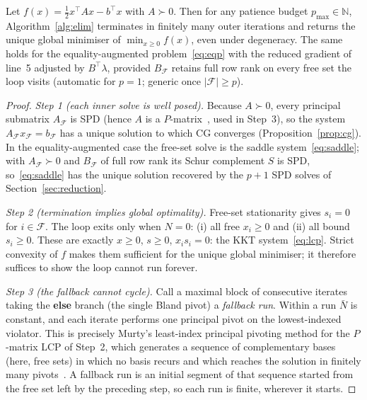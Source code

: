 \begin{theorem}\label{thm:termination}
Let $f(x) = \tfrac{1}{2}x^\top A x - b^\top x$ with $A \succ 0$. Then for any patience budget
$p_{\max} \in \mathbb{N}$, Algorithm~\ref{alg:elim} terminates in finitely many outer
iterations and returns the unique global minimiser of $\min_{x \geq 0} f(x)$, even under degeneracy. The same holds for the equality-augmented
problem~\eqref{eq:eqp} with the reduced gradient of line~5 adjusted by $B^\top\lambda$,
provided $B_{\mathcal{F}}$ retains full row rank on every free set the loop visits (automatic
for $p=1$; generic once $|\mathcal{F}| \geq p$).
\end{theorem}

\begin{proof}
\emph{Step 1 (each inner solve is well posed).}
Because $A \succ 0$, every principal submatrix $A_{\mathcal{F}}$ is SPD (hence $A$ is a
$P$-matrix~\cite{murty1988}, used in Step~3), so the system
$A_{\mathcal{F}}x_{\mathcal{F}} = b_{\mathcal{F}}$ has a unique solution to which CG converges
(Proposition~\ref{prop:cg}). In the
equality-augmented case the free-set solve is the saddle system~\eqref{eq:saddle}; with
$A_{\mathcal{F}} \succ 0$ and $B_{\mathcal{F}}$ of full row rank its Schur complement $S$ is
SPD, so~\eqref{eq:saddle} has the unique solution recovered by the $p+1$ SPD solves of
Section~\ref{sec:reduction}.

\emph{Step 2 (termination implies global optimality).}
Free-set stationarity gives $s_i = 0$ for $i \in \mathcal{F}$. The loop exits only when
$N = 0$: (i) all free $x_i \geq 0$ and (ii) all bound $s_i \geq 0$. These are exactly
$x \geq 0$, $s \geq 0$, $x_i s_i = 0$: the KKT system~\eqref{eq:lcp}. Strict convexity of
$f$ makes them sufficient for the unique global minimiser; it therefore suffices to show the
loop cannot run forever.

\emph{Step 3 (the fallback cannot cycle).}
Call a maximal block of consecutive iterates taking the \textbf{else} branch (the single Bland
pivot) a \emph{fallback run}. Within a run $\bar N$ is constant, and each iterate performs one
principal pivot on the lowest-indexed violator. This is precisely Murty's least-index
principal pivoting method for the $P$-matrix LCP of Step~2, which generates a sequence of
complementary bases (here, free sets) in which no basis recurs and which reaches the solution
in finitely many pivots~\cite{murty1988}. A fallback run is an initial segment of that
sequence started from the free set left by the preceding step, so each run is finite,
wherever it starts.


\end{proof}
